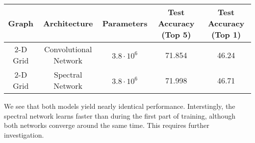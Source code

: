 \begin{center}
\begin{tabular}{|c|c|c|c|c|}
\hline
Graph & Architecture & Parameters & Test Accuracy (Top 5) & Test Accuracy (Top 1)\\
\hline
2-D Grid & Convolutional Network & $3.8 \cdot 10^6$ & 71.854 & 46.24\\
2-D Grid & Spectral Network & $3.8\cdot 10^6$ & 71.998 & 46.71\\
\hline
\end{tabular}
\end{center}

We see that both models yield nearly identical performance. Interstingly, the spectral network learns faster than during the first part of training, although both networks converge around the same time. This requires further investigation.


%
%
%
%
%
